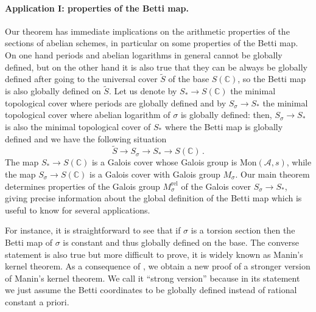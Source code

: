 \documentclass[10 pt,a4paper]{article}
\theoremstyle{plain}
\theoremstyle{definition}
\theoremstyle{named}
\newcommand{\cA}{\mathcal A}
\newcommand{\bC}{\mathbb C}
\begin{document}
\paragraph{Application I: properties of the Betti map.}
Our theorem has immediate implications on the arithmetic properties of the sections of abelian schemes, in particular on some properties of the Betti map. On one hand periods and abelian logarithms in general cannot be globally defined, but on the other hand it is also true that they can be always be globally defined after going to the universal cover $\widetilde{S}$ of the base $S(\bC)$, so the Betti map is also globally defined on $  \widetilde{S}$. Let us denote by $S_* \to S(\bC)$ the minimal topological cover where periods are globally defined and by $S_\sigma \to S_*$ the minimal topological cover where abelian logarithm of $\sigma$ is globally defined: then, $S_\sigma \to S_*$ is also the minimal topological cover of $S_*$ where the Betti map is globally defined and we have the following situation
\[
\widetilde{S} \to S_\sigma \to S_* \to S(\bC)\,.
\]
The map $S_* \to S(\bC)$ is a Galois cover whose Galois group is $\textrm{Mon}(\cA,s)$, while the map $S_\sigma \to S(\bC)$ is a Galois cover with Galois group $M_\sigma$. Our main theorem determines properties of the Galois group $M_\sigma^\textrm{rel}$ of the Galois cover $S_\sigma \to S_*$, giving precise information about the global definition of the Betti map which is useful to know for several applications.

For instance, it is straightforward to see that if $\sigma$ is a torsion section then the Betti map of $\sigma$ is constant and thus globally defined on the base. The converse statement is also true but more difficult to prove, it is widely known as Manin's kernel theorem. As a consequence of , we obtain a new proof of a stronger version of Manin's kernel theorem. We call it ``strong version'' because in its statement we just assume the Betti coordinates to be globally defined instead of rational constant a priori.
\end{document}
